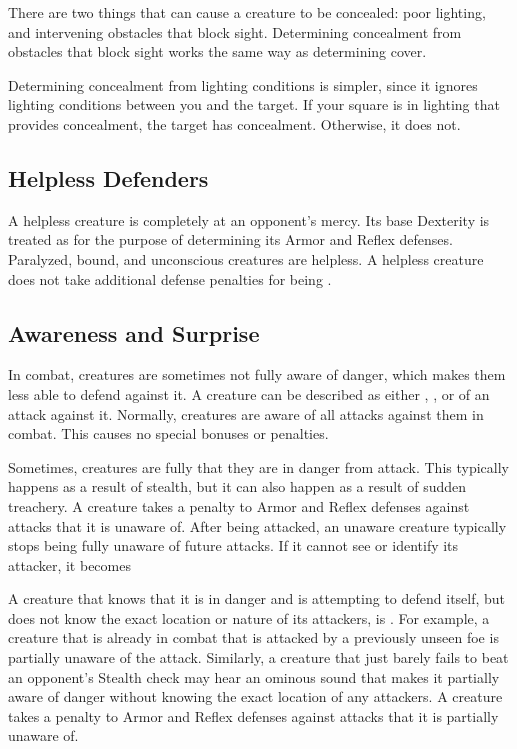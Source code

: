          There are two things that can cause a creature to be concealed: poor lighting, and intervening obstacles that block sight.
        Determining concealment from obstacles that block sight works the same way as determining cover.

        Determining concealment from lighting conditions is simpler, since it ignores lighting conditions between you and the target.
        If your  square is in lighting that provides concealment, the target has concealment.
        Otherwise, it does not.

    \subsection{Helpless Defenders}
        A helpless creature is completely at an opponent's mercy.
        Its base Dexterity is treated as  for the purpose of determining its Armor and Reflex defenses.
        Paralyzed, bound, and unconscious creatures are helpless.
        A helpless creature does not take additional defense penalties for being .

    \subsection{Awareness and Surprise}\label{Awareness and Suprise}
        In combat, creatures are sometimes not fully aware of danger, which makes them less able to defend against it.
        A creature can be described as either , , or  of an attack against it.
        Normally, creatures are aware of all attacks against them in combat.
        This causes no special bonuses or penalties.

        Sometimes, creatures are fully  that they are in danger from attack.
        This typically happens as a result of stealth, but it can also happen as a result of sudden treachery.
        A creature takes a  penalty to Armor and Reflex defenses against attacks that it is unaware of.
        After being attacked, an unaware creature typically stops being fully unaware of future attacks.
        If it cannot see or identify its attacker, it becomes 

        A creature that knows that it is in danger and is attempting to defend itself, but does not know the exact location or nature of its attackers, is .
        For example, a creature that is already in combat that is attacked by a previously unseen foe is partially unaware of the attack.
        Similarly, a creature that just barely fails to beat an opponent's Stealth check may hear an ominous sound that makes it partially aware of danger without knowing the exact location of any attackers.
        A creature takes a  penalty to Armor and Reflex defenses against attacks that it is partially unaware of.

